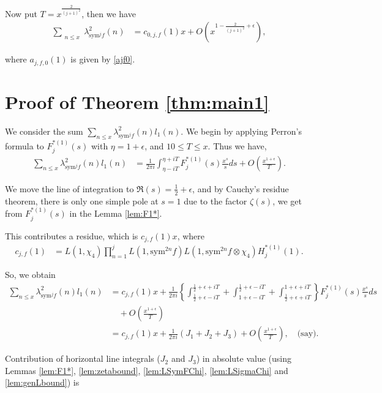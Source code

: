 \documentclass[10pt]{amsart}
\begin{document}
Now put $T=x^{\frac{2}{(j+1)^2}}$, then we have \begin{align}
    \sum_{\substack{n\leq x}}\lambda_{\mathrm{sym}^jf}^2(n) &= c_{0,j,f}(1)x + O \left(x^{1-\frac{2}{(j+1)^2}+\epsilon}\right),
\end{align}

where $a_{j,f,0}(1)$ is given by \eqref{ajf0}.


\section{Proof of Theorem \ref{thm:main1}} \label{sec:main1}

We consider the sum $\sum_{n\leq x}\lambda_{\mathrm{sym}^{j}f}^2(n)l_1(n)$. We begin by applying Perron's formula to $F_{j}^{*(1)}(s)$ with $\eta=1+\epsilon$, and $10\leq T\leq x$. Thus we have,
\begin{align*}
\sum_{n\leq x}\lambda_{\mathrm{sym}^{j}f}^2(n)l_1(n)
&= \frac{1}{2\pi i}\int_{\eta-iT}^{\eta+iT}F_{j}^{*(1)}(s)\frac{x^{s}}{s}ds + O\left(\frac{x^{1+\epsilon}}{T}\right).
\end{align*}

We move the line of integration to $\Re(s)=\frac{1}{2}+\epsilon$, and by Cauchy's residue theorem, there is only one simple pole at $s=1$ due to the factor $\zeta(s)$, we get from $F^{*(1)}_{j}(s)$ in the Lemma \ref{lem:F1*}.

This contributes a residue, which is $c_{j,f}(1)x$, where 
\begin{align} \label{eq:cjf}
c_{j,f}(1) &= L(1,\chi_4)\prod_{n=1}^{j}L(1,\mathrm{sym}^{2n}f)L(1,\mathrm{sym}^{2n}f\otimes\chi_4)H_{j}^{*(1)}(1).
\end{align}

So, we obtain
\begin{align*}
\sum_{n\leq x}\lambda_{\mathrm{sym}^{j}f}^2(n)l_1(n) &= c_{j,f}(1)x + \frac{1}{2\pi i}\left\{\int_{\frac{1}{2}+\epsilon-iT}^{\frac{1}{2}+\epsilon+iT}+\int_{1+\epsilon-iT}^{\frac{1}{2}+\epsilon-iT}+\int_{\frac{1}{2}+\epsilon+iT}^{1+\epsilon+iT}\right\}F_{j}^{*(1)}(s)\frac{x^{s}}{s}ds \\
&\quad + O\left(\frac{x^{1+\epsilon}}{T}\right) \\
&= c_{j,f}(1)x + \frac{1}{2\pi i}(J_{1}+J_{2}+J_{3})+O\left(\frac{x^{1+\epsilon}}{T}\right), \quad \text{(say)}.
\end{align*}

Contribution of horizontal line integrals ($J_{2}$ and $J_{3}$) in absolute value (using Lemmas \ref{lem:F1*}, \ref{lem:zetabound}, \ref{lem:LSymFChi}, \ref{lem:LSigmaChi} and \ref{lem:genLbound}) is
\end{document}
